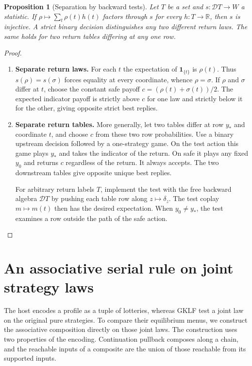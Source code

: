 \documentclass[11pt,a4paper]{article}
\newtheorem{proposition}[theorem]{Proposition}
\theoremstyle{definition}
\newcommand{\D}{\mathcal D}
\begin{document}
\begin{proposition}[Separation by backward tests]\label{prop:separate}
    Let $T$ be a set and $s:\D T\to W$ a statistic. If $\rho\mapsto\sum_t\rho(t)h(t)$ factors through $s$ for every $h:T\to\mathbb R$, then $s$ is injective. A strict binary decision distinguishes any two different return laws. The same holds for two return tables differing at any one row.
\end{proposition}
\begin{proof}\leavevmode
    \begin{enumerate}[titledsteps]
        \item \textbf{Separate return laws.} For each $t$ the expectation of $\mathbf{1}_{\{t\}}$ is $\rho(t)$. Thus $s(\rho)=s(\sigma)$ forces equality at every coordinate, whence $\rho=\sigma$. If $\rho$ and $\sigma$ differ at $t$, choose the constant safe payoff $c=(\rho(t)+\sigma(t))/2$. The expected indicator payoff is strictly above $c$ for one law and strictly below it for the other, giving opposite strict best replies.

        \item \textbf{Separate return tables.} More generally, let two tables differ at row $y_*$ and coordinate $t$, and choose $c$ from these two row probabilities. Use a binary upstream decision followed by a one-strategy game. On the test action this game plays $y_*$ and takes the indicator of the return. On safe it plays any fixed $y_0$ and returns $c$ regardless of the return. It always accepts. The two downstream tables give opposite unique best replies.

        For arbitrary return labels $T$, implement the test with the free backward algebra $\D T$ by pushing each table row along $z\mapsto\delta_z$. The test coplay $m\mapsto m(t)$ then has the desired expectation. When $y_0\ne y_*$, the test examines a row outside the path of the safe action.\qedhere
    \end{enumerate}
\end{proof}

\section{An associative serial rule on joint strategy laws}\label{sec:intrinsic}

The host encodes a profile as a tuple of lotteries, whereas GKLF test a joint law on the original pure strategies. To compare their equilibrium menus, we construct the associative composition directly on those joint laws. The construction uses two properties of the encoding. Continuation pullback composes along a chain, and the reachable inputs of a composite are the union of those reachable from its supported inputs.
\end{document}
